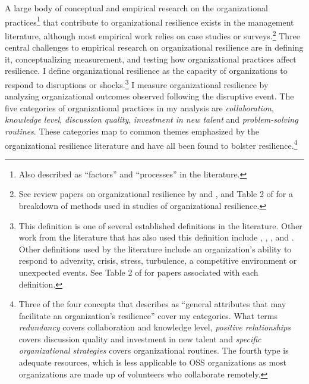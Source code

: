 \documentclass[12pt,notitlepage]{article}
\begin{document}
A large body of conceptual and empirical research on the organizational practices\footnote{Also described as ``factors'' and ``processes'' in the literature.} that contribute to organizational resilience exists in the management literature, although most empirical work relies on case studies or surveys.\footnote{See review papers on organizational resilience by \citealt{annarelli_strategic_2016} and  \citealt{hillmann_organizational_2021}, and Table 2 of \citealt{annarelli_strategic_2016} for a breakdown of methods used in studies of organizational resilience.} 
Three central challenges to empirical research on organizational resilience are in defining it, conceptualizing measurement, and testing how organizational practices affect resilience. 
I define organizational resilience as the capacity of organizations to respond to disruptions or shocks.\footnote{This definition is one of several established definitions in the literature.
Other work from the literature that has also used this definition include \cite{home_iii_coming_1997}, \cite{kantur_organizational_2012}, \cite{boin_resilient_2013}, and \cite{sahebjamnia_integrated_2015}.
Other definitions used by the literature include an organization's ability to respond to adversity, crisis, stress, turbulence, a competitive environment or unexpected events.
See Table 2 of \cite{hillmann_organizational_2021} for papers associated with each definition.}
I measure organizational resilience by analyzing organizational outcomes observed following the disruptive event.
The five categories of organizational practices in my analysis are \textit{collaboration}, \textit{knowledge level}, \textit{discussion quality}, \textit{investment in new talent} and \textit{problem-solving routines}.
These categories map to common themes emphasized by the organizational resilience literature and have all been found to bolster resilience.\footnote{Three of the four concepts that \cite{duchek_organizational_2020} describes as ``general attributes that may facilitate an organization's resilience'' cover my categories.
What  \cite{duchek_organizational_2020} terms \textit{redundancy} covers collaboration and knowledge level, \textit{positive relationships} covers discussion quality and investment in new talent and \textit{specific organizational strategies} covers organizational routines.
The fourth type is adequate resources, which is less applicable to OSS organizations as most organizations are made up of volunteers who collaborate remotely.}
\end{document}
